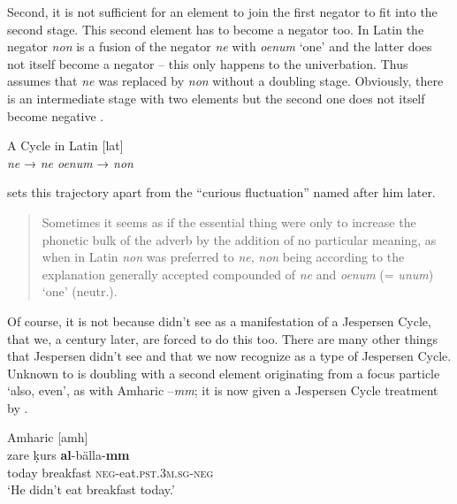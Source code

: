 ﻿\documentclass[output=paper]{langsci/langscibook}
\begin{document}
Second, it is not sufficient for an element to join the first negator to
fit into the second stage. This second element has to become a negator
too. In Latin the negator \textit{non} is a fusion of the negator
\textit{ne} with \textit{oenum} `one' and the latter does not itself
become a negator -- this only happens to the univerbation. Thus
\textcite[14--15]{Jespersen1917} assumes that \textit{ne} was replaced by
\textit{non} without a doubling stage. Obviously, there is an
intermediate stage with two elements but the second one does not itself
become negative .
%
\begin{exe}\ex\label{ex:int-a-cycle-in-latin}
          A Cycle in Latin [lat]\\[1ex]
\textit{ne} \hspace{5mm}  →  \hspace{5mm}  \textit{ne oenum}  \hspace{5mm}  →  \hspace{5mm}  \textit{non}
    \end{exe}
%
\textcite[14--15]{Jespersen1917} sets this trajectory apart from the ``curious fluctuation'' named after him later. 
%
\begin{quote}
Sometimes it seems as if the essential thing were only to increase the phonetic bulk of the adverb by the addition of no particular meaning, as when in Latin \textit{non} was preferred to \textit{ne}, \textit{non} being according to the explanation generally accepted compounded of \textit{ne} and \textit{oenum} (= \textit{unum}) `one' (neutr.).
\end{quote}
%
Of course, it is not because \textcite[14--15]{Jespersen1917} didn't see
 as a manifestation of a Jespersen Cycle, that we, a century
later, are forced to do this too. There are many other things that
Jespersen didn't see and that we now recognize as a type of Jespersen
Cycle. Unknown to \textcite{Jespersen1917} is doubling with a second element
originating from a focus particle `also, even', as with Amharic
–\textit{mm}; it is now given a Jespersen Cycle treatment by
\textcite[305--306, 349--350, 2018: 341--343, 388--389]{Sjors2015}
 \parencite[cp. also][69 on the Loyalty Islands languages Drehu
and Nengone]{MoyseFaurieOzanneRivierre1999}.
%
\begin{exe}\ex\label{ex:int-amharic-breakfast}
Amharic [amh] \\
    \gll zare  ḳurs    \textbf{al}-bälla-\textbf{mm} \\
  today  breakfast  \textsc{neg}-eat.\textsc{pst.3m.sg-neg}  \\
    \glt `He didn't eat breakfast today.'
    \end{exe}
\end{document}
